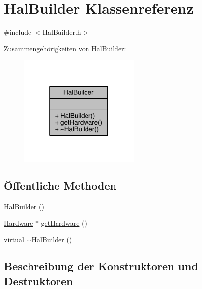 \hypertarget{class_hal_builder}{}\section{Hal\+Builder Klassenreferenz}
\label{class_hal_builder}


{\ttfamily \#include $<$Hal\+Builder.\+h$>$}



Zusammengehörigkeiten von Hal\+Builder\+:\nopagebreak
\begin{figure}[H]
\begin{center}
\leavevmode
\includegraphics[width=169pt]{class_hal_builder__coll__graph}
\end{center}
\end{figure}
\subsection*{Öffentliche Methoden}
\begin{DoxyCompactItemize}
\item 
\hyperlink{class_hal_builder_a722e3025d6c9659efcc011df559d0619}{Hal\+Builder} ()
\item 
\hyperlink{class_hardware}{Hardware} $\ast$ \hyperlink{class_hal_builder_addc8f400dfa9dee3f0d9de116512212f}{get\+Hardware} ()
\item 
virtual \hyperlink{class_hal_builder_af77e28e213c8aa028b18cf435e9ef3c8}{$\sim$\+Hal\+Builder} ()
\end{DoxyCompactItemize}


\subsection{Beschreibung der Konstruktoren und Destruktoren}
\hypertarget{class_hal_builder_a722e3025d6c9659efcc011df559d0619}{}\label{class_hal_builder_a722e3025d6c9659efcc011df559d0619} 
